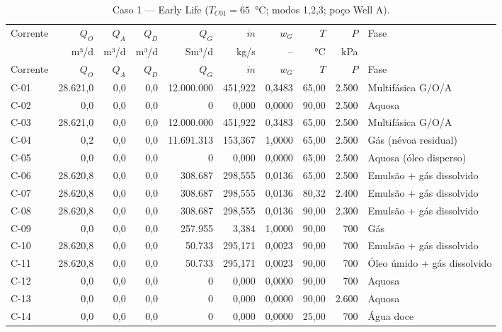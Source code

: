 \documentclass[11pt,a4paper]{article}
\numberwithin{equation}{section}
\numberwithin{table}{section}
\numberwithin{figure}{section}
\begin{document}
{\footnotesize\setlength{\tabcolsep}{3pt}\begin{longtable}{lrrrrrrrrL{2.5cm}}
\caption{Caso 1 --- Early Life ($T_{C01}=65$~°C; modos 1,2,3; poço Well A).}\\\toprule
Corrente & $Q_O$ & $Q_A$ & $Q_D$ & $Q_G$ & $\dot m$ & $w_G$ & $T$ & $P$ & Fase\\ & m³/d & m³/d & m³/d & Sm³/d & kg/s & -- & °C & kPa & \\\midrule\endfirsthead
\toprule Corrente & $Q_O$ & $Q_A$ & $Q_D$ & $Q_G$ & $\dot m$ & $w_G$ & $T$ & $P$ & Fase\\\midrule\endhead
C-01 & 28.621,0 & 0,0 & 0,0 & 12.000.000 & 451,922 & 0,3483 & 65,00 & 2.500 & {\scriptsize Multifásica G/O/A}\\
C-02 & 0,0 & 0,0 & 0,0 & 0 & 0,000 & 0,0000 & 90,00 & 2.500 & {\scriptsize Aquosa}\\
C-03 & 28.621,0 & 0,0 & 0,0 & 12.000.000 & 451,922 & 0,3483 & 65,00 & 2.500 & {\scriptsize Multifásica G/O/A}\\
C-04 & 0,2 & 0,0 & 0,0 & 11.691.313 & 153,367 & 1,0000 & 65,00 & 2.500 & {\scriptsize Gás (névoa residual)}\\
C-05 & 0,0 & 0,0 & 0,0 & 0 & 0,000 & 0,0000 & 65,00 & 2.500 & {\scriptsize Aquosa (óleo disperso)}\\
C-06 & 28.620,8 & 0,0 & 0,0 & 308.687 & 298,555 & 0,0136 & 65,00 & 2.500 & {\scriptsize Emulsão + gás dissolvido}\\
C-07 & 28.620,8 & 0,0 & 0,0 & 308.687 & 298,555 & 0,0136 & 80,32 & 2.400 & {\scriptsize Emulsão + gás dissolvido}\\
C-08 & 28.620,8 & 0,0 & 0,0 & 308.687 & 298,555 & 0,0136 & 90,00 & 2.300 & {\scriptsize Emulsão + gás dissolvido}\\
C-09 & 0,0 & 0,0 & 0,0 & 257.955 & 3,384 & 1,0000 & 90,00 & 700 & {\scriptsize Gás}\\
C-10 & 28.620,8 & 0,0 & 0,0 & 50.733 & 295,171 & 0,0023 & 90,00 & 700 & {\scriptsize Emulsão + gás dissolvido}\\
C-11 & 28.620,8 & 0,0 & 0,0 & 50.733 & 295,171 & 0,0023 & 90,00 & 700 & {\scriptsize Óleo úmido + gás dissolvido}\\
C-12 & 0,0 & 0,0 & 0,0 & 0 & 0,000 & 0,0000 & 90,00 & 700 & {\scriptsize Aquosa}\\
C-13 & 0,0 & 0,0 & 0,0 & 0 & 0,000 & 0,0000 & 90,00 & 2.600 & {\scriptsize Aquosa}\\
C-14 & 0,0 & 0,0 & 0,0 & 0 & 0,000 & 0,0000 & 25,00 & 700 & {\scriptsize Água doce}\\

\end{longtable}}
\end{document}
